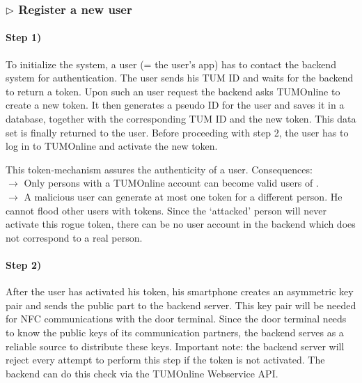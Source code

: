 \subsubsection*{$\triangleright$ Register a new user}

\paragraph{Step 1)}
To initialize the system, a user (= the user's \app app) has to contact the backend system for authentication.
The user sends his TUM ID and waits for the backend to return a token.
Upon such an user request the backend asks TUMOnline to create a new token.
It then generates a pseudo ID for the user and saves it in a database, together with the corresponding TUM ID and the new token.
This data set is finally returned to the user.
Before proceeding with step 2, the user has to log in to TUMOnline and activate the new token.

\medskip

\noindent This token-mechanism assures the authenticity of a user. Consequences:\\
$\rightarrow$ Only persons with a TUMOnline account can become valid users of \app.\\
$\rightarrow$ A malicious user can generate at most one token for a different person. He cannot flood other users with tokens. Since the `attacked' person will never activate this rogue token, there can be no user account in the backend which does not correspond to a real person.



\paragraph{Step 2)}
After the user has activated his token, his smartphone creates an asymmetric key pair and sends the public part to the backend server.
This key pair will be needed for NFC communications with the door terminal.
Since the door terminal needs to know the public keys of its communication partners, the backend serves as a reliable source to distribute these keys.
Important note: the backend server will reject every attempt to perform this step if the token is not activated. The backend can do this check via the TUMOnline Webservice API.



